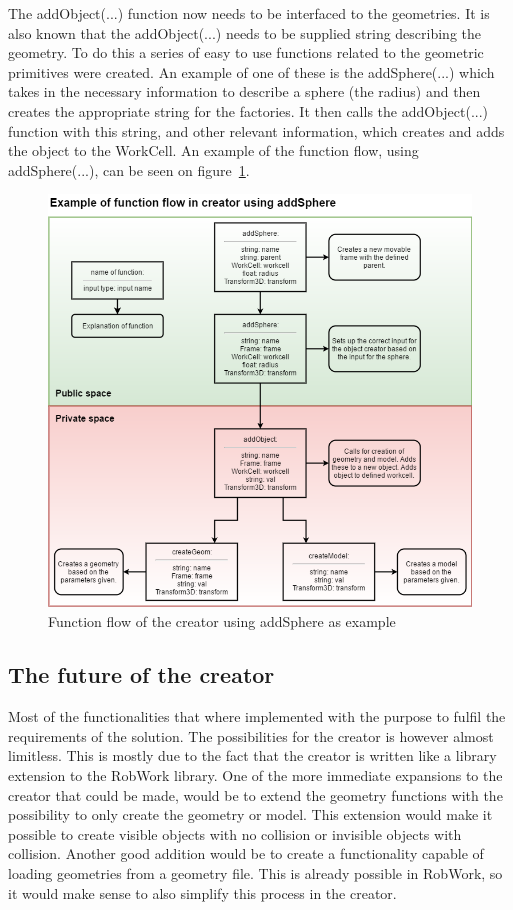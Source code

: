 The addObject(...) function now needs to be interfaced to the geometries. It is also known that the addObject(...) needs to be supplied string describing the geometry. To do this a series of easy to use functions related to the geometric primitives were created. An example of one of these is the addSphere(...) which takes in the necessary information to describe a sphere (the radius) and then creates the appropriate string for the factories. It then calls the addObject(...) function with this string, and other relevant information, which creates and adds the object to the WorkCell. An example of the function flow, using addSphere(...), can be seen on figure~\ref{fig:CreatorFlow}.

\begin{figure}[h]
	\centering
	\includegraphics[scale=0.55]{Figures/CreatorFlow.png}
	\caption{Function flow of the creator using addSphere as example}
	\label{fig:CreatorFlow}
\end{figure}

\subsection{The future of the creator}
Most of the functionalities that where implemented with the purpose to fulfil the requirements of the solution. The possibilities for the creator is however almost limitless. This is mostly due to the fact that the creator is written like a library extension to the RobWork library. One of the more immediate expansions to the creator that could be made, would be to extend the geometry functions with the possibility to only create the geometry or model. This extension would make it possible to create visible objects with no collision or invisible objects with collision. Another good addition would be to create a functionality capable of loading geometries from a geometry file. This is already possible in RobWork, so it would make sense to also simplify this process in the creator.
